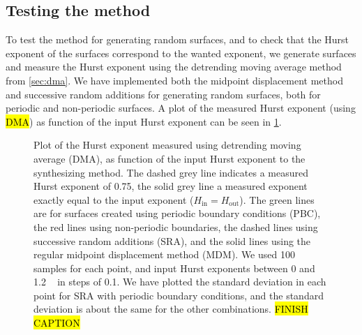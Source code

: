 \subsection{Testing the method}
To test the method for generating random surfaces, and to check that the Hurst exponent of the surfaces correspond to the wanted exponent, we generate surfaces and measure the Hurst exponent using the detrending moving average method from \cref{sec:dma}. We have implemented both the midpoint displacement method and successive random additions for generating random surfaces, both for periodic and non-periodic surfaces. A plot of the measured Hurst exponent (using \hl{DMA}) as function of the input Hurst exponent can be seen in \cref{fig:diamond_square_testing}.%
%
\begin{figure}[htpb]%
    \centering%
    {
        \newcommand{\f}{\footnotesize}%
        \newcommand{\x}{\text}%
        \newcommand{\hh}{{\f $H_\x{in}=H_\x{out}$}}%
    }
    \caption{%
        Plot of the Hurst exponent measured using detrending moving average (DMA), as function of the input Hurst exponent to the synthesizing method. The dashed grey line indicates a measured Hurst exponent of 0.75, the solid grey line a measured exponent exactly equal to the input exponent ($H_\text{in} = H_\text{out}$). The green lines are for surfaces created using periodic boundary conditions (PBC), the red lines using non-periodic boundaries, the dashed lines using successive random additions (SRA), and the solid lines using the regular midpoint displacement method (MDM). We used 100 samples for each point, and input Hurst exponents between 0 and 1.2%
        \protect\footnotemark\ %
        in steps of 0.1. We have plotted the standard deviation in each point for SRA with periodic boundary conditions, and the standard deviation is about the same for the other combinations. %
        \hl{FINISH CAPTION} %
        \label{fig:diamond_square_testing}%
    }%
\end{figure}%

